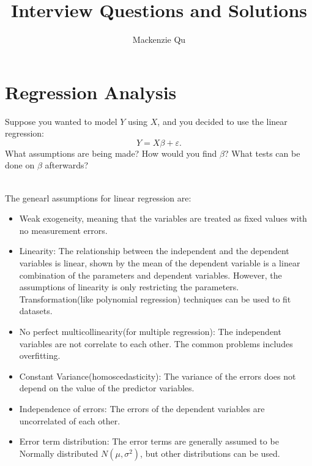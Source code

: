 \documentclass[answers]{exam}
\begin{document}
\title{Interview Questions and Solutions}
\author{Mackenzie Qu}
\maketitle
\thispagestyle{empty}
\section{Regression Analysis}
\begin{questions}
\question Suppose you wanted to model $Y$ using $X$, and you decided to use the linear regression:
\[
  Y = X \beta + \varepsilon
  \text{.}
\]
What assumptions are being made?
How would you find $\beta$?
What tests can be done on $\beta$ afterwards?

\begin{solution}[.2in]
    \\
    The genearl assumptions for linear regression are:
    \begin{itemize}
        \item Weak exogeneity, meaning that the variables are treated as fixed values with no 
        measurement errors.
        \item Linearity: The relationship between the independent and the dependent
     variables is linear, shown by the mean of the dependent variable is a linear combination
     of the parameters and dependent variables. However, the assumptions of linearity is only restricting the parameters.
     Transformation(like polynomial regression) techniques can be used to fit datasets.
        \item No perfect multicollinearity(for multiple regression): The independent variables are not correlate to each other. The common problems includes overfitting.
        \item Constant Variance(homoscedasticity): The variance of the errors does not depend on the value of
        the predictor variables.
        \item Independence of errors: The errors of the dependent variables are uncorrelated of each other.
        \item Error term distribution: The error terms are generally assumed to be Normally distributed $N(\mu, \sigma^2)$, but other distributions can be used. 
    \end{itemize}

\end{solution}


\end{questions}
\end{document}

